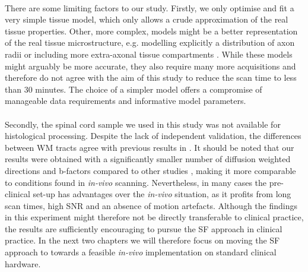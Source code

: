 \paragraph{}
There are some limiting factors to our study. Firstly, we only optimise and fit a very simple tissue model, which only allows a crude approximation of the real tissue properties. Other, more complex, models might be a better representation of the real tissue microstructure, e.g. modelling explicitly a distribution of axon radii \citep{Barazany:2009} or including more extra-axonal tissue compartments \citep{Stanisz:1997,Wang:2011,Panagiotaki:2012}.  While these models might arguably be more accurate, they also require many more acquisitions and therefore do not agree with the aim of this study to reduce the scan time to less than 30 minutes. The choice of a simpler model offers a compromise of manageable data requirements and informative model parameters.
\paragraph{}
Secondly, the spinal cord sample we used in this study was not available for histological processing. Despite the lack of independent validation, the differences between WM tracts agree with previous results in \citep{Golabchi:2010}. It should be noted that our results were obtained with a significantly smaller number of diffusion weighted directions and b-factors compared to other studies \citep{Assaf:2008,Barazany:2009,Panagiotaki:2012}, making it more comparable to conditions found in \emph{in-vivo} scanning. Nevertheless, in many cases the pre-clinical set-up has advantages over the \emph{in-vivo} situation, as it profits from long scan times, high \gls{SNR} and an absence of motion artefacts. Although the findings in this experiment might therefore not be directly transferable to clinical practice, the results are sufficiently encouraging to pursue the \gls{SF}{} approach in clinical practice. In the next two chapters we will therefore focus on moving the \gls{SF}{} approach to towards a feasible \emph{in-vivo} implementation on standard clinical hardware.



